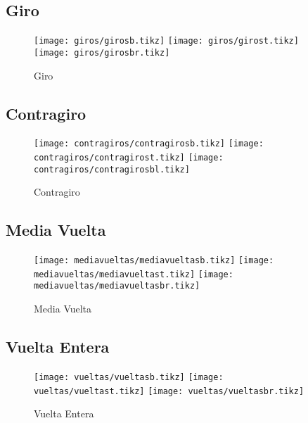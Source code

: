 \FloatBarrier
\subsection{Giro}
\label{subsec:giros}

\begin{figure}[h]
	\texttt{[image: giros/girosb.tikz]}
	\hspace*{\fill}
	\texttt{[image: giros/girost.tikz]}
	\hspace*{\fill}
	\texttt{[image: giros/girosbr.tikz]}
	\caption{Giro}
	\label{fig:giros}
\end{figure}

\FloatBarrier
\subsection{Contragiro}
\label{subsec:contragiros}

\begin{figure}[h]
	\texttt{[image: contragiros/contragirosb.tikz]}
	\hspace*{\fill}
	\texttt{[image: contragiros/contragirost.tikz]}
	\hspace*{\fill}
	\texttt{[image: contragiros/contragirosbl.tikz]}
	\caption{Contragiro}
	\label{fig:contragiro}
\end{figure}

\FloatBarrier
\subsection{Media Vuelta}
\label{subsec:mediavuelta}

\begin{figure}[h]
	\texttt{[image: mediavueltas/mediavueltasb.tikz]}
	\hspace*{\fill}
	\texttt{[image: mediavueltas/mediavueltast.tikz]}
	\hspace*{\fill}
	\texttt{[image: mediavueltas/mediavueltasbr.tikz]}
	\caption{Media Vuelta}
	\label{fig:mediavuelta}
\end{figure}

\FloatBarrier
\subsection{Vuelta Entera}
\label{subsec:vuelta}

\begin{figure}[h]
	\texttt{[image: vueltas/vueltasb.tikz]}
	\hspace*{\fill}
	\texttt{[image: vueltas/vueltast.tikz]}
	\hspace*{\fill}
	\texttt{[image: vueltas/vueltasbr.tikz]}
	\caption{Vuelta Entera}
	\label{fig:vuelta}
\end{figure}

